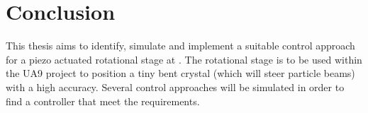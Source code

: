 \chapter{Conclusion}\label{cha:conclusion}

This thesis aims to identify, simulate and implement a suitable control approach for a piezo actuated rotational stage at \abbrCERN. The rotational stage is to be used within the UA9 project to position a tiny bent crystal (which will steer particle beams) with a high accuracy. Several control approaches will be simulated in order to find a controller that meet the requirements.
